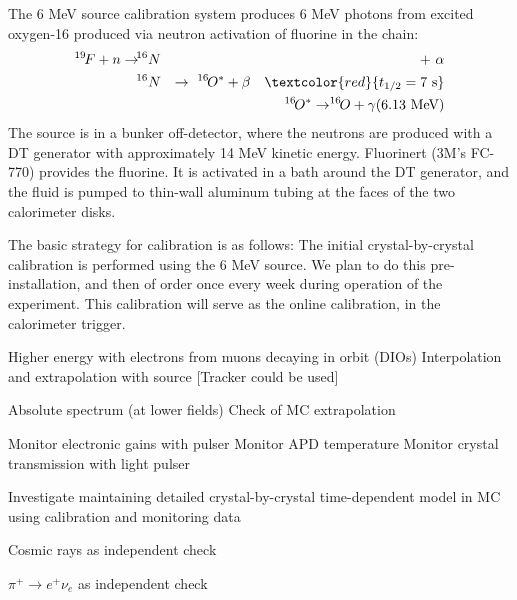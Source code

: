 The 6 MeV source calibration system produces 6 MeV photons from excited oxygen-16
produced via neutron activation of fluorine in the chain:
\begin{eqnarray}
^{19\!}F + n \to\! &^{16}N& +\ \alpha\cr
 &^{16}N& \to\ ^{16\!}O^* + \beta\quad \textcolor{red}{t_{1/2} = 7\hbox{ s}}\cr
  &\phantom{^{16}N}& \phantom{\to}\ \ ^{16\!}O^* \to ^{16\!\!\!}O + \gamma (6.13\hbox{ MeV})\nonumber
\end{eqnarray}
The source is in a bunker off-detector, where the neutrons are produced with a DT generator
with approximately 14 MeV kinetic energy. Fluorinert (3M's FC-770) provides the fluorine. It is activated
in a bath around the DT generator, and the fluid is pumped to thin-wall aluminum tubing at the
faces of the two calorimeter disks.  

The basic strategy for calibration is as follows:
The initial crystal-by-crystal calibration is performed using the 6 MeV source. We plan to do this
pre-installation, and then of order once every week during operation of the experiment. This
calibration will serve as the online calibration, in the calorimeter trigger.

Higher energy with electrons from muons decaying in orbit (DIOs)
 Interpolation and extrapolation with source
 [Tracker could be used] 
 
Absolute spectrum (at lower fields)
 Check of MC extrapolation

Monitor electronic gains with pulser
 Monitor APD temperature
 Monitor crystal transmission with light pulser

 Investigate maintaining detailed crystal-by-crystal time-dependent model in MC
using calibration and monitoring data

Cosmic rays as independent check

$\pi^+\to e^+\nu_e$ as independent check
